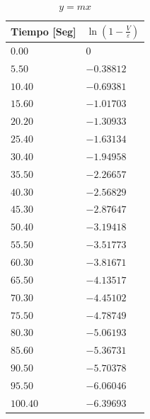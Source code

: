 \documentclass[twocolumn, 12pt]{article}
\begin{document}
\begin{table}[H]
    \centering
    \begin{tabularx}{0.9\linewidth}{|>{\centering\arraybackslash}X|>{\centering\arraybackslash}X|}

        \hline
        Tiempo \textbf{[Seg]} & $\ln (1- \frac{V}{\varepsilon})$ \\\hline
        $0.00$                & $0$                              \\\hline
        $5.50$                & $-0.38812$                       \\\hline
        $10.40$               & $-0.69381$                       \\\hline
        $15.60$               & $-1.01703$                       \\\hline
        $20.20$               & $-1.30933$                       \\\hline
        $25.40$               & $-1.63134$                       \\\hline
        $30.40$               & $-1.94958$                       \\\hline
        $35.50$               & $-2.26657$                       \\\hline
        $40.30$               & $-2.56829$                       \\\hline
        $45.30$               & $-2.87647$                       \\\hline
        $50.40$               & $-3.19418$                       \\\hline
        $55.50$               & $-3.51773$                       \\\hline
        $60.30$               & $-3.81671$                       \\\hline
        $65.50$               & $-4.13517$                       \\\hline
        $70.30$               & $-4.45102$                       \\\hline
        $75.50$               & $-4.78749$                       \\\hline
        $80.30$               & $-5.06193$                       \\\hline
        $85.60$               & $-5.36731$                       \\\hline
        $90.50$               & $-5.70378$                       \\\hline
        $95.50$               & $-6.06046$                       \\\hline
        $100.40$              & $-6.39693$                       \\\hline

    \end{tabularx}

    \caption{$y = mx$}
    \label{tab:yEqualsMX__Carga}
\end{table}
\end{document}
